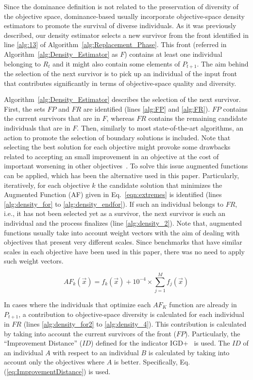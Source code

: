 Since the dominance definition is not related to the preservation of diversity of the objective space,
dominance-based \MOEAS{} usually incorporate objective-space density estimators to promote the survival
of diverse individuals.
%
As it was previously described, our density estimator selects a new survivor from the front identified
in line \ref{alg:13} of Algorithm~\ref{alg:Replacement_Phase}.
%
This front (referred in Algorithm~\ref{alg:Density_Estimator}  as $F$) contains at least one individual belonging to $R_t$ and it might also contain some elements 
of $P_{t+1}$.
%
The aim behind the selection of the next survivor is to pick up an individual of the input front
that contributes significantly in terms of objective-space quality and diversity. %

Algorithm~\ref{alg:Density_Estimator} describes the selection of the next survivor.
%
First, the sets $FP$ and $FR$ are identified (lines \ref{alg:FP} and \ref{alg:FR}).
%
$FP$ contains the current survivors that are in $F$, whereas $FR$ contains
the remaining candidate individuals that are in $F$.
%
Then, similarly to most state-of-the-art algorithms, an action to promote the selection of boundary solutions
is included.
%
Note that selecting the best solution for each objective might provoke some drawbacks related to accepting an small improvement
in an objective at the cost of important worsening in other objectives~\cite{deb2016optimality}.
%
To solve this issue augmented functions can be applied, which has been the alternative used in this paper.
%
Particularly, iteratively, for each objective $k$ the candidate solution that minimizes the Augmented Function (AF)
given in Eq.~\ref{eqn:extremes} is identified (lines \ref{alg:density_for} to \ref{alg:density_endfor}).
%
If such an individual belongs to $FR$, i.e., it has not been selected yet as a survivor, the next survivor is such an individual
and the process finalizes (line \ref{alg:density_2}).
%
Note that, augmented functions usually take into account weight vectors with the aim of dealing with objectives
that present very different scales.
%
Since benchmarks that have similar scales in each objective have been used in this paper, there was no need to apply
such weight vectors.

\begin{equation}\label{eqn:extremes}
AF_k (\vec{x}) = f_k(\vec{x}) + 10^{-4} \times  \sum_{j=1}^M f_j( \vec{x} )
\end{equation}

In cases where the individuals that optimize each $AF_K$ function are already in $P_{t+1}$, a contribution
to objective-space diversity is calculated for each individual in $FR$ (lines \ref{alg:density_for2} to \ref{alg:density_4}).
%
This contribution is calculated by taking into account the current survivors of the front ($FP$).
%
%
Particularly, the ``Improvement Distance'' ($ID$) defined for the indicator IGD+~\cite{Joel:Inverted_Generational_Distance_Plus}
is used.
%
The $ID$ of an individual $A$ with respect to an individual $B$ is calculated by taking into account only the objectives
where $A$ is better.
%
Specifically, Eq. (\ref{eq:ImprovementDistance}) is used.

